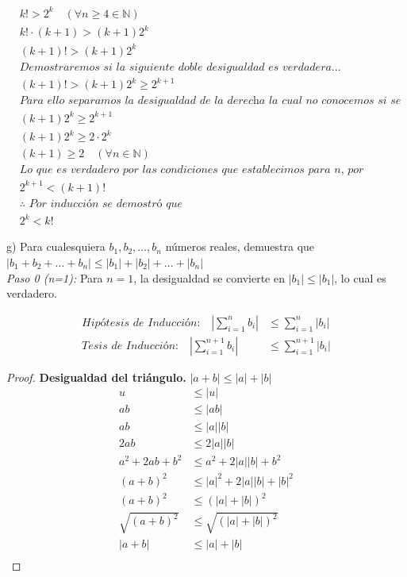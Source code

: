 \documentclass{article}
\begin{document}
\begin{align*}
& k!>2^k \quad (\forall n \geq 4 \in \mathbb{N}) \\
& k! \cdot (k+1) > (k+1)2^k \\
& (k+1)! > (k+1)2^k \\
&\textit{Demostraremos si la siguiente doble desigualdad es verdadera...} \\
& (k+1)! > (k+1)2^k \geq 2^{k+1} \\
&\textit{Para ello separamos la desigualdad de la derecha la cual no conocemos si se cumpla} \\
&(k+1)2^k \geq 2^{k+1} \\
&(k+1)2^k \geq 2 \cdot 2^k \\
&(k+1) \geq 2 \quad (\forall n \in \mathbb{N}) \\
&\textit{Lo que es verdadero por las condiciones que establecimos para n, por transitividad se infiere...} \\
&2^{k+1}<(k+1)! \\
&\therefore \textit{ Por inducción se demostró que } \\
&2^k<k!
\end{align*}
  
  
  \newpage
  g) Para cualesquiera \(b_1, b_2, \ldots, b_n\) números reales, demuestra que \(|b_1+b_2+\ldots+b_n|\leq|b_1|+|b_2|+\ldots+|b_n|\) \\

\textit{Paso 0 (n=1):}
Para \(n = 1\), la desigualdad se convierte en \(|b_1| \leq |b_1|\), lo cual es verdadero.


\begin{align*}
\textit{Hipótesis de Inducción:} \quad \left| \sum_{i = 1}^{n} b_i \right| &\leq \sum_{i = 1}^{n} |b_i| \\
\textit{Tesis de Inducción:} \quad \left| \sum_{i = 1}^{n+1} b_i \right| &\leq \sum_{i = 1}^{n+1} |b_i|
\end{align*}

\begin{mdframed}
\begin{proof}\textbf{Desigualdad del triángulo.}  $ |a+b| \leq |a| + |b| $ \\
\begin{align*}
    u &\leq |u| \\
    ab &\leq |ab| \\
    ab &\leq |a||b| \\
    2ab &\leq 2|a||b| \\
    a^2 + 2ab + b^2 &\leq a^2 + 2|a||b| + b^2 \\
    (a + b)^2 &\leq |a|^2 + 2|a||b| + |b|^2 \\
    (a + b)^2 &\leq (|a| + |b|)^2 \\
    \sqrt{(a + b)^2} &\leq \sqrt{(|a| + |b|)^2} \\
    |a + b| &\leq |a| + |b| \\
\end{align*}
\end{proof}
\end{mdframed}
\end{document}
